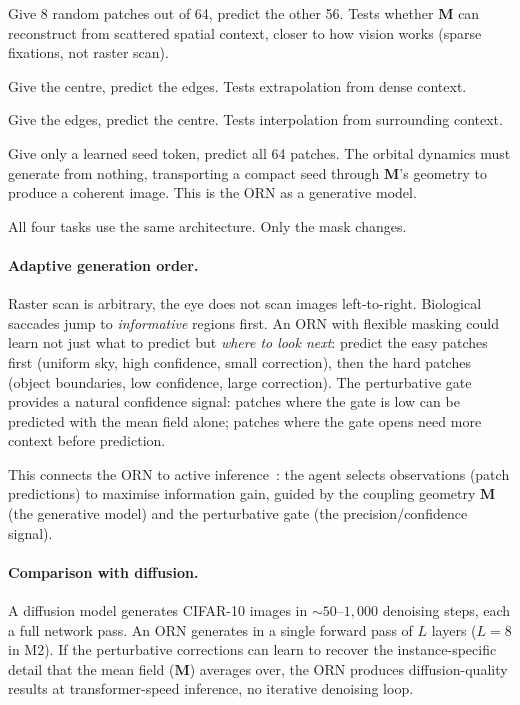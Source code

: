 \documentclass[11pt, a4paper]{article}
\newcommand{\M}{\mathbf{M}}
\theoremstyle{plain}
\theoremstyle{remark}
\begin{document}
\begin{description}[nosep, leftmargin=1.5em]
    \item[Sparse completion:] Give 8 random patches out of 64, predict the other 56. Tests whether $\M$ can reconstruct from scattered spatial context, closer to how vision works (sparse fixations, not raster scan).
    \item[Outpainting:] Give the centre, predict the edges. Tests extrapolation from dense context.
    \item[Inpainting:] Give the edges, predict the centre. Tests interpolation from surrounding context.
    \item[Unconditional generation:] Give only a learned seed token, predict all 64 patches. The orbital dynamics must generate from nothing, transporting a compact seed through $\M$'s geometry to produce a coherent image. This is the ORN as a generative model.
\end{description}

All four tasks use the same architecture. Only the mask changes.

\paragraph{Adaptive generation order.}
Raster scan is arbitrary, the eye does not scan images left-to-right.
Biological saccades jump to \emph{informative} regions first.
An ORN with flexible masking could learn not just what to predict but \emph{where to look next}: predict the easy patches first (uniform sky, high confidence, small correction), then the hard patches (object boundaries, low confidence, large correction).
The perturbative gate provides a natural confidence signal: patches where the gate is low can be predicted with the mean field alone; patches where the gate opens need more context before prediction.

This connects the ORN to active inference~\cite{friston2010free}: the agent selects observations (patch predictions) to maximise information gain, guided by the coupling geometry $\M$ (the generative model) and the perturbative gate (the precision/confidence signal).

\paragraph{Comparison with diffusion.}
A diffusion model generates CIFAR-10 images in ${\sim}50$--$1{,}000$ denoising steps, each a full network pass.
An ORN generates in a single forward pass of $L$ layers ($L{=}8$ in M2).
If the perturbative corrections can learn to recover the instance-specific detail that the mean field ($\M$) averages over, the ORN produces diffusion-quality results at transformer-speed inference, no iterative denoising loop.
\end{document}
